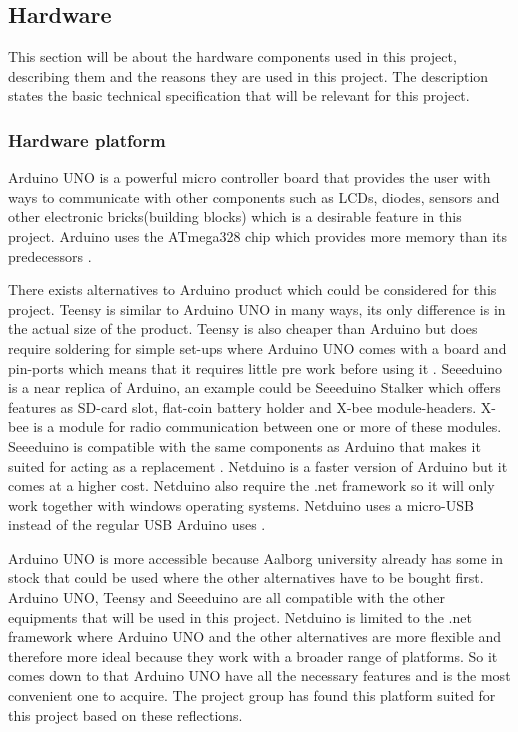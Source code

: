 \subsection{Hardware}
\label{sec:Hardware}
This section will be about the hardware components used in this project, describing them and the reasons they are used in this project. The description states the basic technical specification that will be relevant for this project.

\subsubsection{Hardware platform}
\label{sec:hardwarearduino}
Arduino UNO is a powerful micro controller board that provides the user with ways to communicate with other components such as LCDs, diodes, sensors and other electronic bricks(building blocks) which is a desirable feature in this project. Arduino uses the ATmega328 chip which provides more memory than its predecessors \citep{ArduinoUno}.

There exists alternatives to Arduino product which could be considered for this project. Teensy is similar to Arduino UNO in many ways, its only difference is in the actual size of the product. Teensy is also cheaper than Arduino but does require soldering for simple set-ups where Arduino UNO comes with a board and pin-ports which means that it requires little pre work before using it \citep{Teensy}.
Seeeduino is a near replica of Arduino, an example could be Seeeduino Stalker which offers features as SD-card slot, flat-coin battery holder and X-bee module-headers. X-bee is a module for radio communication between one or more of these modules. Seeeduino is compatible with the same components as 
Arduino that makes it suited for acting as a replacement \citep{Seedui}.
Netduino is a faster version of Arduino but it comes at a higher cost. Netduino also require the .net framework so it will only work together with windows operating systems. Netduino uses a micro-USB instead of the regular USB Arduino uses \citep{Netdui}.

Arduino UNO is more accessible because Aalborg university already has some in stock that could be used where the other alternatives have to be bought first. Arduino UNO, Teensy and Seeeduino are all compatible with the other equipments that will be used in this project. Netduino is limited to the .net framework where Arduino UNO and the other alternatives are more flexible and therefore more ideal because they work with a broader range of platforms.
So it comes down to that Arduino UNO have all the necessary features and is the most convenient one to acquire. The project group has found this platform suited for this project based on these reflections. 

